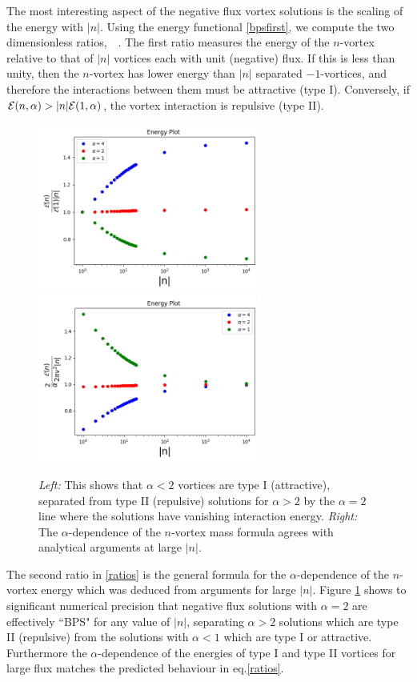 The most interesting aspect of the negative flux vortex solutions is the scaling of the energy with $|n|$. Using the energy functional \eqref{bpsfirst}, we compute the two dimensionless ratios,
\be
{}\, \qquad {} \quad{} \quad{}\,.\label{ratios}
\ee
The first ratio measures the energy of the $n$-vortex relative to that of $|n|$ vortices each with unit (negative) flux. If this is less than unity, then the $n$-vortex has lower energy than $|n|$ separated $-1$-vortices, and therefore the interactions between them must be attractive (type I). Conversely, if ${\cal E}(n, \alpha) > |n|{\cal E}(1, \alpha)$, the vortex interaction is repulsive (type II). 
\begin{figure}[h]
\begin{center}
 \includegraphics[width=2.90in]{Chapter_2_Folder_1912.11321/figures/bpsrationeg.png}\hspace{0.1in}
    \includegraphics[width=2.90in]{Chapter_2_Folder_1912.11321/figures/mass1neg.png}
   \caption{{\small{\it Left:} This shows that $\alpha < 2$ vortices are type I (attractive), separated from type II (repulsive) solutions for $\alpha>2$ by the $\alpha=2$ line where the solutions have vanishing interaction energy. {\it Right:} The $\alpha$-dependence of the $n$-vortex mass formula agrees with analytical arguments at large $|n|$. }} \label{fig:massn1}
   \end{center}
\end{figure}
The second ratio in \eqref{ratios} is the general formula for the $\alpha$-dependence of the $n$-vortex energy which was deduced from arguments for large $|n|$. Figure \ref{fig:massn1} shows to significant numerical precision that negative flux solutions with $\alpha=2$ are effectively ``BPS" for any value of  $|n|$, separating $\alpha> 2$ solutions which are type II (repulsive) from the solutions with $\alpha < 1$ which are type I or attractive. Furthermore the $\alpha$-dependence of the energies of type I and type II vortices for large flux matches the predicted behaviour in eq.\eqref{ratios}. 

